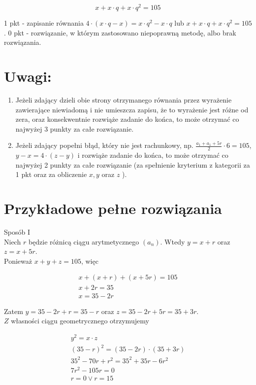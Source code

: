 \documentclass[10pt]{article}
\begin{document}
$$
x+x \cdot q+x \cdot q^{2}=105
$$

1 pkt - zapisanie równania $4 \cdot(x \cdot q-x)=x \cdot q^{2}-x \cdot q$ lub $x+x \cdot q+x \cdot q^{2}=105$. 0 pkt - rozwiązanie, w którym zastosowano niepoprawną metodę, albo brak rozwiązania.

\section*{Uwagi:}
\begin{enumerate}
  \item Jeżeli zdający dzieli obie strony otrzymanego równania przez wyrażenie zawierające niewiadomą i nie umieszcza zapisu, że to wyrażenie jest różne od zera, oraz konsekwentnie rozwiąże zadanie do końca, to może otrzymać co najwyżej 3 punkty za całe rozwiązanie.
  \item Jeżeli zdający popełni błąd, który nie jest rachunkowy, np. $\frac{a_{1}+a_{1}+5 r}{2} \cdot 6=105$, $y-x=4 \cdot(z-y)$ i rozwiąże zadanie do końca, to może otrzymać co najwyżej 2 punkty za całe rozwiązanie (za spełnienie kryterium z kategorii za 1 pkt oraz za obliczenie $x, y$ oraz $z$ ).
\end{enumerate}

\section*{Przykładowe pełne rozwiązania}
Sposób I\\
Niech $r$ będzie różnicą ciągu arytmetycznego $\left(a_{n}\right)$. Wtedy $y=x+r$ oraz $z=x+5 r$.\\
Ponieważ $x+y+z=105$, więc

$$
\begin{gathered}
x+(x+r)+(x+5 r)=105 \\
x+2 r=35 \\
x=35-2 r
\end{gathered}
$$

Zatem $y=35-2 r+r=35-r$ oraz $z=35-2 r+5 r=35+3 r$.\\
$Z$ własności ciągu geometrycznego otrzymujemy

$$
\begin{gathered}
y^{2}=x \cdot z \\
(35-r)^{2}=(35-2 r) \cdot(35+3 r) \\
35^{2}-70 r+r^{2}=35^{2}+35 r-6 r^{2} \\
7 r^{2}-105 r=0 \\
r=0 \vee r=15
\end{gathered}
$$
\end{document}
